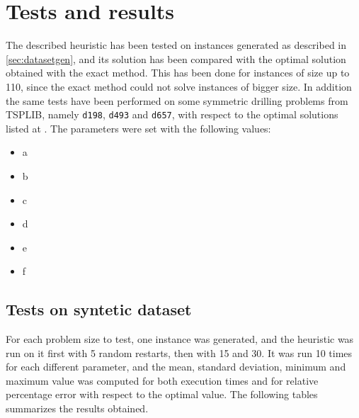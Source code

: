 
\section{Tests and results}
\label{sec:results}
The described heuristic has been tested on instances generated as described in \cref{sec:datasetgen}, and its solution has been compared with the optimal solution obtained with the exact method. This has been done for instances of size up to 110, since the exact method could not solve instances of bigger size. In addition the same tests have been performed on some symmetric drilling problems from TSPLIB, namely \texttt{d198}, \texttt{d493} and \texttt{d657}, with respect to the optimal solutions listed at \cite{Tsplibsol}.
The parameters were set with the following values:
\begin{itemize}
	\setlength\itemsep{0.03em}
	\item a
	\item b
	\item c
	\item d
	\item e
	\item f
\end{itemize}

\subsection{Tests on syntetic dataset}
For each problem size to test, one instance was generated, and the heuristic was run on it first with 5 random restarts, then with 15 and 30. It was run 10 times for each different parameter, and the mean, standard deviation, minimum and maximum value was computed for both execution times and for relative percentage error with respect to the optimal value. The following tables summarizes the results obtained.



